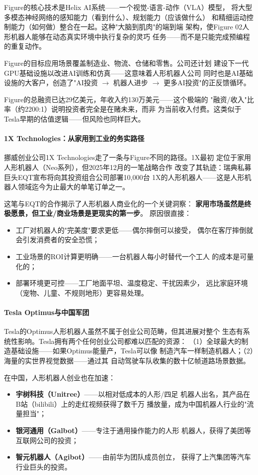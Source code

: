 Figure的核心技术是Helix AI系统——一个视觉-语言-动作（VLA）模型，
将大型多模态神经网络的感知能力（看到什么）、规划能力（应该做什么）
和精细运动控制能力（如何做）整合在一起。这种"大脑到肌肉"的端到端
架构，使Figure 02人形机器人能够在动态真实环境中执行复杂的灵巧
任务——而不是只能完成预编程的重复动作。

Figure的目标应用场景覆盖制造业、物流、仓储和零售。公司还计划
建设下一代GPU基础设施以改进AI训练和仿真——这意味着人形机器人公司
同时也是AI基础设施的大客户，创造了"AI投资 $\to$ 机器人进步 $\to$
更多AI投资"的正反馈循环。

Figure的总融资已达29亿美元，年收入约130万美元——这个极端的
"融资/收入"比率（约2200:1）说明投资者完全是在赌未来，而非
为当前收入付费。这类似于Tesla早期的估值逻辑——但风险也同样巨大。

\paragraph{1X Technologies：从家用到工业的务实路径}
挪威创业公司1X Technologies走了一条与Figure不同的路径。1X最初
定位于家用人形机器人（Neo系列），但2025年12月的一笔战略合作
改变了其轨迹：瑞典私募巨头EQT宣布将向其投资组合公司部署10,000台
1X的人形机器人——这是人形机器人领域迄今为止最大的单笔订单之一。

这笔与EQT的合作揭示了人形机器人商业化的一个关键洞察：
\textbf{家用市场虽然是终极愿景，但工业/商业场景是更现实的第一步}。
原因很直接：
\begin{itemize}
  \item 工厂对机器人的"完美度"要求更低——偶尔摔倒可以接受，
    偶尔在客厅摔倒就会引发消费者的安全恐慌；
  \item 工业场景的ROI计算更明确——一台机器人每小时替代一个工人
    的成本是可量化的；
  \item 部署环境更可控——工厂地面平坦、温度稳定、干扰因素少，
    远比家庭环境（宠物、儿童、不规则地形）更容易处理。
\end{itemize}

\paragraph{Tesla Optimus与中国军团}
Tesla的Optimus人形机器人虽然不属于创业公司范畴，但其进展对整个
生态有系统性影响。Tesla拥有两个任何创业公司都难以匹配的资源：
（1）全球最大的制造基础设施——如果Optimus能量产，Tesla可以像
制造汽车一样制造机器人；（2）海量的实世界视觉数据——通过其
自动驾驶车队收集的数十亿帧道路场景数据。

在中国，人形机器人创业也在加速：
\begin{itemize}
  \item \textbf{宇树科技（Unitree）}——以相对低成本的人形/四足
    机器人出名，其产品在B站（bilibili）上的走红视频获得了数千万
    播放量，成为中国机器人行业的"流量担当"；
  \item \textbf{银河通用（Galbot）}——专注于通用操作能力的人形
    机器人，获得了美团等互联网公司的投资；
  \item \textbf{智元机器人（Agibot）}——由前华为团队成员创立，
    获得了上汽集团等汽车行业巨头的投资。
\end{itemize}


